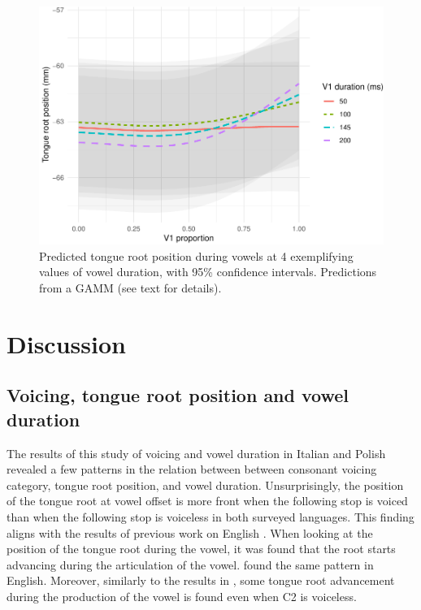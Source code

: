 \documentclass[12pt,]{article}
\begin{document}
\begin{figure}
\includegraphics[width=\linewidth]{2018-tra_files/figure-latex/tra-gam-2-plot-1} \caption{Predicted tongue root position during vowels at 4 exemplifying values of vowel duration, with 95\% confidence intervals. Predictions from a GAMM (see text for details).}\label{f:tra-gam-2-plot}
\end{figure}

\hypertarget{discussion}{%
\section{Discussion}\label{discussion}}

\label{s:discussion}

\hypertarget{voicing-tongue-root-position-and-vowel-duration}{%
\subsection{Voicing, tongue root position and vowel
duration}\label{voicing-tongue-root-position-and-vowel-duration}}

The results of this study of voicing and vowel duration in Italian and
Polish revealed a few patterns in the relation between between consonant
voicing category, tongue root position, and vowel duration.
Unsurprisingly, the position of the tongue root at vowel offset is more
front when the following stop is voiced than when the following stop is
voiceless in both surveyed languages. This finding aligns with the
results of previous work on English
\citep{kent1969, perkell1969, westbury1983, ahn2018}. When looking at
the position of the tongue root during the vowel, it was found that the
root starts advancing during the articulation of the vowel.
\citet{westbury1983} found the same pattern in English. Moreover,
similarly to the results in \citet{westbury1983}, some tongue root
advancement during the production of the vowel is found even when C2 is
voiceless.
\end{document}
